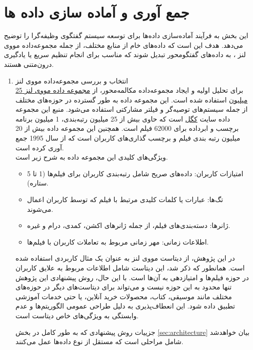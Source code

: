 \section{جمع آوری و آماده سازی داده ها}
\label{chap:dataset}
این بخش به فرآیند آماده‌سازی داده‌ها برای توسعه سیستم گفتگوی وظیفه‌گرا را توضیح می‌دهد. هدف این است که داده‌های خام از منابع مختلف، از جمله مجموعه‌داده 
مووی لنز%
، به داده‌های گفتگو‌محور تبدیل شوند که مناسب برای انجام تنظیم سریع یا یادگیری درون‌متنی%
 هستند.
\begin{enumerate}
\item
انتخاب و بررسی مجموعه‌داده مووی لنز\\
برای تحلیل اولیه و ایجاد مجموعه‌داده مکالمه‌محور، از 
\href{https://www.kaggle.com/datasets/garymk/movielens-25m-dataset}{مجموعه داده مووی لنز 25 میلیون}
 استفاده شده است. این مجموعه داده به طور گسترده در حوزه‌های مختلف از جمله سیستم‌های توصیه‌گر و فیلتر مشارکتی استفاده می‌شود. منبع این مجموعه داده سایت 
\href{https://www.kaggle.com}{کگل}
 است که حاوی بیش از 25 میلیون رتبه‌بندی، 1 میلیون برنامه برچسب و ابرداده برای 62000 فیلم است. همچنین این مجموعه داده بیش از 20 میلیون رتبه بندی فیلم و برچسب گذاری‌های کاربران است که از سال 1995 جمع آوری کرده است. \\


ویژگی‌های کلیدی این مجموعه داده به شرح زیر است.
\begin{itemize}
\item
امتیازات کاربران: داده‌های صریح شامل رتبه‌بندی کاربران برای فیلم‌ها (1 تا 5 ستاره).
\item
تگ‌ها: عبارات یا کلمات کلیدی مرتبط با فیلم که توسط کاربران اعمال می‌شوند.
\item
ژانرها: دسته‌بندی‌های فیلم، از جمله ژانرهای اکشن، کمدی، درام و غیره.
\item
اطلاعات زمانی: مهر زمانی مربوط به تعاملات کاربران با فیلم‌ها.
\end{itemize}

در این پژوهش، از دیتاست مووی لنز به عنوان یک مثال کاربردی استفاده شده است. همانطور که ذکر شد، این دیتاست شامل اطلاعات مربوط به علایق کاربران در حوزه فیلم‌ها و امتیازدهی به آن‌ها است. با این حال، روش پیشنهادی این پژوهش تنها محدود به این حوزه نیست و می‌تواند برای دیتاست‌های دیگر در حوزه‌های مختلف مانند موسیقی، کتاب، محصولات خرید آنلاین، یا حتی خدمات آموزشی تطبیق داده شود. این انعطاف‌پذیری به دلیل طراحی عمومی الگوریتم‌ها و عدم وابستگی به ویژگی‌های خاص دیتاست است.
 
جزییات روش پیشنهادی که به طور کامل در بخش%
\ref{sec:architecture}
 بیان خواهدشد شامل مراحلی است که مستقل از نوع داده‌ها عمل می‌کنند.


\end{enumerate}
